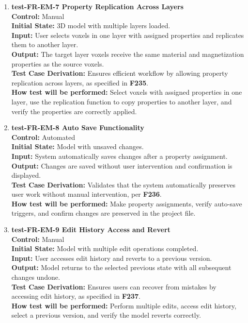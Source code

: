 \documentclass[12pt, titlepage]{article}
\begin{document}
\begin{enumerate}
  \item \textbf{test-FR-EM-7 Property Replication Across Layers} \\[2mm]
    \textbf{Control:} Manual \\ 
    \textbf{Initial State:} 3D model with multiple layers loaded. \\ 
    \textbf{Input:} User selects voxels in one layer with assigned properties and replicates them to another layer. \\ 
    \textbf{Output:} The target layer voxels receive the same material and magnetization properties as the source voxels. \\[2mm]
    \textbf{Test Case Derivation:} Ensures efficient workflow by allowing property replication across layers, as specified in \textbf{F235}. \\[2mm]
    \textbf{How test will be performed:} Select voxels with assigned properties in one layer, use the replication function to copy properties to another layer, and verify the properties are correctly applied.

  \item \textbf{test-FR-EM-8 Auto Save Functionality} \\[2mm]
    \textbf{Control:} Automated \\ 
    \textbf{Initial State:} Model with unsaved changes. \\ 
    \textbf{Input:} System automatically saves changes after a property assignment. \\ 
    \textbf{Output:} Changes are saved without user intervention and confirmation is displayed. \\[2mm]
    \textbf{Test Case Derivation:} Validates that the system automatically preserves user work without manual intervention, per \textbf{F236}. \\[2mm]
    \textbf{How test will be performed:} Make property assignments, verify auto-save triggers, and confirm changes are preserved in the project file.

  \item \textbf{test-FR-EM-9 Edit History Access and Revert} \\[2mm]
    \textbf{Control:} Manual \\ 
    \textbf{Initial State:} Model with multiple edit operations completed. \\ 
    \textbf{Input:} User accesses edit history and reverts to a previous version. \\ 
    \textbf{Output:} Model returns to the selected previous state with all subsequent changes undone. \\[2mm]
    \textbf{Test Case Derivation:} Ensures users can recover from mistakes by accessing edit history, as specified in \textbf{F237}. \\[2mm]
    \textbf{How test will be performed:} Perform multiple edits, access edit history, select a previous version, and verify the model reverts correctly.


\end{enumerate}
\end{document}
